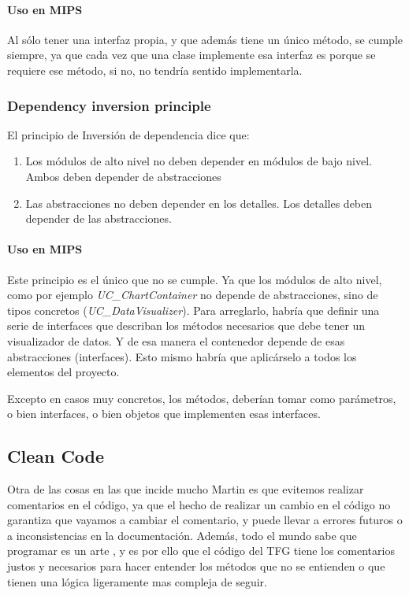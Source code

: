 \paragraph{Uso en MIPS}
Al s\'olo tener una interfaz propia, y que adem\'as tiene un \'unico m\'etodo, se cumple siempre, ya que
cada vez que una clase implemente esa interfaz es porque se requiere ese m\'etodo, si no, no tendr\'ia sentido
implementarla.

\subsubsection{Dependency inversion principle}
El principio de Inversi\'{o}n de dependencia \cite{SOLID:DIP} dice que:
\begin{enumerate}
    \item Los m\'{o}dulos de alto nivel no deben depender en m\'{o}dulos de bajo nivel. Ambos deben depender de abstracciones
    \item Las abstracciones no deben depender en los detalles. Los detalles deben depender de las abstracciones.
\end{enumerate}

\paragraph{Uso en MIPS}
Este principio es el \'unico que no se cumple. Ya que los m\'odulos de alto nivel, como por ejemplo
\emph{UC\_ChartContainer} no depende de abstracciones, sino de tipos concretos (\emph{UC\_DataVisualizer}).
Para arreglarlo, habr\'ia que definir una serie de interfaces que describan los m\'etodos necesarios que 
debe tener un visualizador de datos. Y de esa manera el contenedor depende de esas abstracciones (interfaces).
Esto mismo habr\'ia que aplic\'arselo a todos los elementos del proyecto.

Excepto en casos muy concretos, los m\'etodos, deber\'ian tomar como par\'ametros, o bien interfaces, o bien
objetos que implementen esas interfaces.

\subsection{Clean Code}
Otra de las cosas en las que incide mucho Martin es que evitemos realizar comentarios en el c\'odigo,
ya que el hecho de realizar un cambio en el c\'odigo no garantiza que vayamos a cambiar el comentario, y 
puede llevar a errores futuros o a inconsistencias en la documentaci\'on. Adem\'as, todo el mundo sabe que programar
es un arte \cite{Art:Programming}, y es por ello que el c\'odigo del TFG tiene los comentarios justos y necesarios
para hacer entender los m\'etodos que no se entienden o que tienen una l\'ogica ligeramente mas compleja de seguir.


